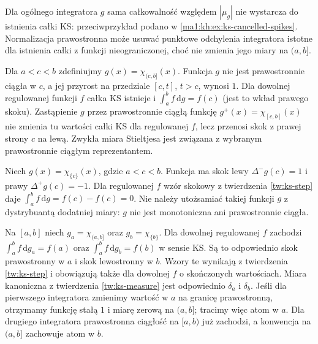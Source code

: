 \begin{uwaga}
Dla ogólnego integratora $g$ sama całkowalność
względem $|\mu_g|$ nie wystarcza do istnienia
całki KS: przeciwprzykład podano w
\ref{ma1:kh:ex:ks-cancelled-spikes}. Normalizacja
prawostronna może usuwać punktowe odchylenia
integratora istotne dla istnienia całki z funkcji
nieograniczonej, choć nie zmienia jego miary
na $(a,b]$.
\end{uwaga}

\begin{przyklad}
Dla $a<c<b$ zdefiniujmy $g(x)=\chi_{(c,b]}(x)$. Funkcja $g$ nie jest prawostronnie ciągła w $c$, a jej przyrost na przedziale $[c,t]$, $t>c$, wynosi $1$. Dla dowolnej regulowanej funkcji $f$ całka KS istnieje i $\int_a^b f\,\mathrm dg=f(c)$ (jest to wkład prawego skoku). Zastąpienie $g$ przez prawostronnie ciągłą funkcję $g^+(x)=\chi_{[c,b]}(x)$ nie zmienia tu wartości całki KS dla regulowanej $f$, lecz przenosi skok z prawej strony $c$ na lewą. Zwykła miara Stieltjesa jest związana z wybranym prawostronnie ciągłym reprezentantem.
\end{przyklad}
\begin{przyklad}
Niech $g(x)=\chi_{\{c\}}(x)$, gdzie $a<c<b$. Funkcja ma skok lewy $\Delta^-g(c)=1$ i prawy $\Delta^+g(c)=-1$. Dla regulowanej $f$ wzór skokowy z twierdzenia \ref{tw:ks-step} daje $\int_a^b f\,\mathrm dg=f(c)-f(c)=0$. Nie należy utożsamiać takiej funkcji $g$ z dystrybuantą dodatniej miary: $g$ nie jest monotoniczna ani prawostronnie ciągła.
\end{przyklad}
\begin{przyklad}
Na $[a,b]$ niech $g_a=\chi_{(a,b]}$ oraz $g_b=\chi_{\{b\}}$. Dla dowolnej regulowanej $f$ zachodzi
$\int_a^b f\,\mathrm dg_a=f(a)$ oraz $\int_a^b f\,\mathrm dg_b=f(b)$ w sensie KS. Są to odpowiednio skok prawostronny w $a$ i skok lewostronny w $b$. Wzory te wynikają z twierdzenia \ref{tw:ks-step} i obowiązują także dla dowolnej $f$ o skończonych wartościach. Miara kanoniczna z twierdzenia \ref{tw:ks-measure} jest odpowiednio $\delta_a$ i $\delta_b$. Jeśli dla pierwszego integratora zmienimy wartość w $a$ na granicę prawostronną, otrzymamy funkcję stałą $1$ i miarę zerową na $(a,b]$; tracimy więc atom w $a$. Dla drugiego integratora prawostronna ciągłość na $[a,b)$ już zachodzi, a konwencja na $(a,b]$ zachowuje atom w $b$.
\end{przyklad}

